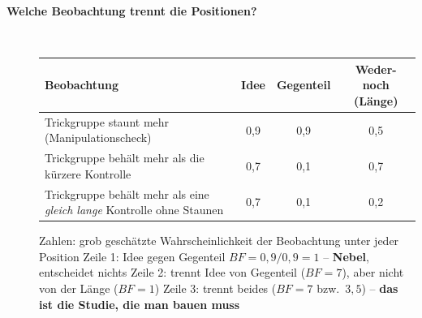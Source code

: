 \begin{description}
\item[{\rot\bf Welche Beobachtung trennt die Positionen?}]~\\[-\lblskip]
\begin{center}
\small
\begin{tabular}{@{}p{}ccc@{}}
\toprule
\textbf{Beobachtung} & \textbf{Idee} & \textbf{Gegenteil} & \textbf{Weder-noch (Länge)} \\
\midrule
Trickgruppe staunt mehr (Manipulationscheck) & 0,9 & 0,9 & 0,5 \\
Trickgruppe behält mehr als die kürzere Kontrolle & 0,7 & 0,1 & 0,7 \\
Trickgruppe behält mehr als eine \emph{gleich lange} Kontrolle ohne Staunen & 0,7 & 0,1 & 0,2 \\
\bottomrule
\end{tabular}
\end{center}
\bi
  \ite Zahlen: grob geschätzte Wahrscheinlichkeit der Beobachtung unter
    jeder Position
  \ite Zeile 1: Idee gegen Gegenteil $\mathit{BF}=0{,}9/0{,}9=1$ --
    \textbf{Nebel}, entscheidet nichts
  \ite Zeile 2: trennt Idee von Gegenteil ($\mathit{BF}=7$), aber nicht
    von der Länge ($\mathit{BF}=1$)
  \ite Zeile 3: trennt beides ($\mathit{BF}=7$ bzw.\ $3{,}5$) -- \textbf{das
    ist die Studie, die man bauen muss}
\ei
{}
\os{\newpage}


\end{description}
